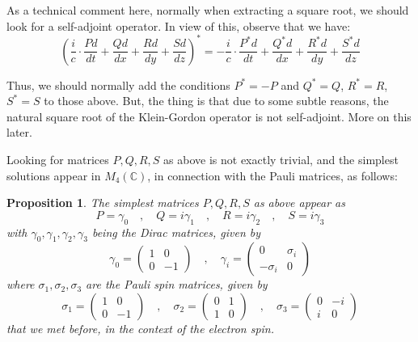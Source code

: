 \documentclass[12pt]{amsbook}
\newtheorem{proposition}[theorem]{Proposition}
\begin{document}
As a technical comment here, normally when extracting a square root, we should look for a self-adjoint operator. In view of this, observe that we have:
$$\left(\frac{i}{c}\cdot\frac{Pd}{dt}+\frac{Qd}{dx}+\frac{Rd}{dy}+\frac{Sd}{dz}\right)^*
=-\frac{i}{c}\cdot\frac{P^*d}{dt}+\frac{Q^*d}{dx}+\frac{R^*d}{dy}+\frac{S^*d}{dz}$$

Thus, we should normally add the conditions $P^*=-P$ and $Q^*=Q$, $R^*=R$, $S^*=S$ to those above. But, the thing is that due to some subtle reasons, the natural square root of the Klein-Gordon operator is not self-adjoint. More on this later.

\bigskip

Looking for matrices $P,Q,R,S$ as above is not exactly trivial, and the simplest solutions appear in $M_4(\mathbb C)$, in connection with the Pauli matrices, as follows:

\begin{proposition}
The simplest matrices $P,Q,R,S$ as above appear as
$$P=\gamma_0\quad,\quad Q=i\gamma_1\quad,\quad R=i\gamma_2\quad,\quad S=i\gamma_3$$
with $\gamma_0,\gamma_1,\gamma_2,\gamma_3$ being the Dirac matrices, given by
$$\gamma_0=\begin{pmatrix}1&0\\0&-1\end{pmatrix}
\quad,\quad\gamma_i=\begin{pmatrix}0&\sigma_i\\-\sigma_i&0\end{pmatrix}$$
where $\sigma_1,\sigma_2,\sigma_3$ are the Pauli spin matrices, given by
$$\sigma_1=\begin{pmatrix}1&0\\0&-1\end{pmatrix}
\quad,\quad \sigma_2=\begin{pmatrix}0&1\\1&0\end{pmatrix}
\quad,\quad \sigma_3=\begin{pmatrix}0&-i\\i&0\end{pmatrix}$$
that we met before, in the context of the electron spin.
\end{proposition}
\end{document}
